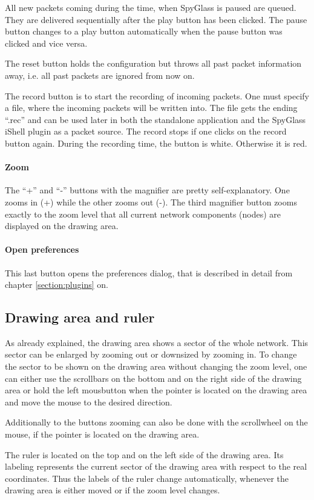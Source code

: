 All new packets coming during the time, when SpyGlass is paused are queued. They are delivered sequentially after the
play button has been clicked. The pause button changes to a play button automatically when the pause button was clicked
and vice versa.

The reset button holds the configuration but throws all past packet information away, i.e. all past packets are ignored from
now on.

The record button is to start the recording of incoming packets. One must specify a file, where the incoming packets will be
written into. The file gets the ending ``.rec'' and can be used later in both the standalone application and the
SpyGlass iShell plugin as a packet source. The record stops if one clicks on the record button again. During the recording
time, the button is white. Otherwise it is red.

\paragraph{Zoom}

The ``+'' and ``-'' buttons with the magnifier are pretty self-explanatory. One zooms in (+) while the other zooms out (-).
The third magnifier button zooms exactly to the zoom level that all current network components (nodes) are displayed on the
drawing area. 

\paragraph{Open preferences}

This last button opens the preferences dialog, that is described in detail from chapter \ref{section:plugins} on.


\subsection{Drawing area and ruler}

As already explained, the drawing area shows a sector of the whole network. This sector can be enlarged by zooming out
or downsized by zooming in. To change the sector to be shown on the drawing area without changing the zoom level,
one can either use the scrollbars
on the bottom and on the right side of the drawing area or hold the left mousbutton when the pointer is located on the 
drawing area and move the mouse to the desired direction.

Additionally to the buttons zooming can also be done with the scrollwheel on the mouse, if the pointer is located
on the drawing area.

The ruler is located on the top and on the left side of the drawing area. Its labeling represents the current sector
of the drawing area with respect to the real coordinates. Thus the labels of the ruler change automatically,
whenever the drawing area is either moved or if the zoom level changes.